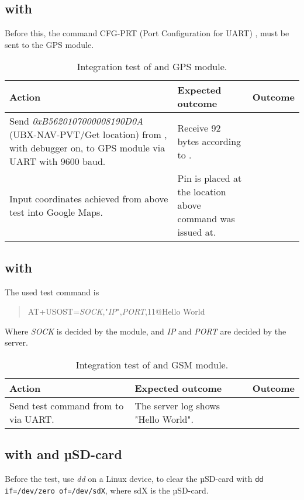 \subsection{\MKR with \GPS}
Before this, the command CFG-PRT (Port Configuration for UART) \cite[p.~119-120]{NEO7_proto}, must be sent to the GPS module.

\begin{table}[H]
	\centering
	\begin{tabularx}{\textwidth}{p{4.3cm} X X}
		\toprule
		\textbf{Action} & \textbf{Expected outcome} & \textbf{Outcome} \\
		\midrule
		Send \textit{0xB5620107000008190D0A} (UBX-NAV-PVT/Get location) from \MKR, with debugger on, to GPS module via UART with \num{9600} baud. & Receive \num{92} bytes according to \cite[p.~160-161]{NEO7_proto}. & \\
		Input coordinates achieved from above test into Google Maps. & Pin is placed at the location above command was issued at. & \\
		\bottomrule
	\end{tabularx}
	\caption{Integration test of \MKR and \GPS GPS module.}
	\label{AT:intGPS}
\end{table}

\subsection{\MKR with \SARA}
The used test command is
\begin{quote}
	AT+USOST=\textit{SOCK},"\textit{IP}",\textit{PORT},11@Hello World
\end{quote}
Where \textit{SOCK} is decided by the \SARA module, and \textit{IP} and \textit{PORT} are decided by the server.

\begin{table}[H]
	\centering
	\begin{tabularx}{\textwidth}{p{4.3cm} X X}
		\toprule
		\textbf{Action} & \textbf{Expected outcome} & \textbf{Outcome} \\
		\midrule
		Send test command from \MKR to \SARA via UART. & The server log shows "Hello World". & \\
		\bottomrule
	\end{tabularx}
	\caption{Integration test of \MKR and \SARA GSM module.}
	\label{AT:intGSM}
\end{table}

\subsection{\MKR with \SDsock and µSD-card}
Before the test, use \textit{dd} on a Linux device, to clear the µSD-card with \texttt{dd if=/dev/zero of=/dev/sdX}, where sdX is the µSD-card.

